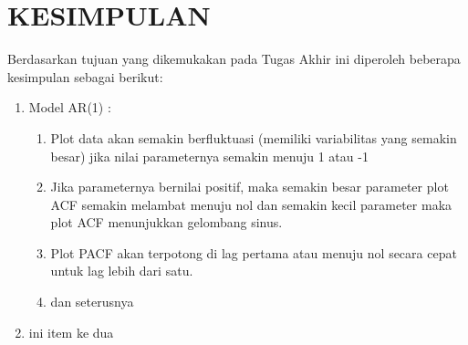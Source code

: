 \chapter{KESIMPULAN}
Berdasarkan tujuan yang dikemukakan pada Tugas Akhir ini diperoleh beberapa kesimpulan sebagai berikut:
\begin{enumerate}
	\item Model AR(1) :
	\begin{enumerate}
		\item Plot data akan semakin berfluktuasi (memiliki variabilitas yang semakin besar) jika nilai parameternya semakin menuju 1 atau -1
		\item Jika parameternya bernilai positif, maka semakin besar parameter plot ACF semakin melambat menuju nol dan semakin kecil parameter maka plot ACF menunjukkan gelombang sinus. 
		\item Plot PACF akan terpotong di lag pertama atau menuju nol secara cepat untuk lag lebih dari satu.
		\item dan seterusnya
	\end{enumerate}
	\item ini item ke dua
\end{enumerate}